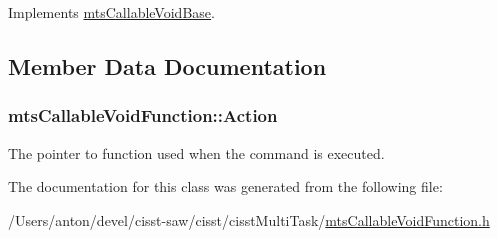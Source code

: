 Implements \hyperlink{classmts_callable_void_base_aca49f7ddbc0b2a1d79a78558dc1114b2}{mts\+Callable\+Void\+Base}.



\subsection{Member Data Documentation}
\hypertarget{classmts_callable_void_function_a61118c744dd0d62db9f06ba75fbfe292}{}
\subsubsection[{Action}]{ mts\+Callable\+Void\+Function\+::\+Action\hspace{0.3cm}{\ttfamily [protected]}}\label{classmts_callable_void_function_a61118c744dd0d62db9f06ba75fbfe292}
The pointer to function used when the command is executed. 

The documentation for this class was generated from the following file\+:\begin{DoxyCompactItemize}
\item 
/\+Users/anton/devel/cisst-\/saw/cisst/cisst\+Multi\+Task/\hyperlink{mts_callable_void_function_8h}{mts\+Callable\+Void\+Function.\+h}\end{DoxyCompactItemize}

